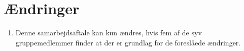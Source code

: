\section{Ændringer}
\begin{enumerate}
\item{Denne samarbejdsaftale kan kun ændres, hvis fem af de syv gruppemedlemmer finder at der er
grundlag for de foreslåede ændringer.}
\end{enumerate}
